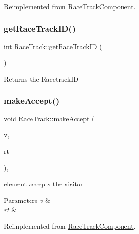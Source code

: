 Reimplemented from \mbox{\hyperlink{class_race_track_component_a6b57a071d1f11ddccd416fdbfe7e973b}{Race\+Track\+Component}}.

\mbox{\label{class_race_track_af85156b4218d023460f5287e6b866226}} 
\subsubsection{\texorpdfstring{get\+Race\+Track\+I\+D()}{getRaceTrackID()}}
{\footnotesize\ttfamily int Race\+Track\+::get\+Race\+Track\+ID (\begin{DoxyParamCaption}{ }\end{DoxyParamCaption})\hspace{0.3cm}{\ttfamily [inline]}}

\begin{DoxyReturn}{Returns}
the Racetrack\+ID 
\end{DoxyReturn}
\mbox{\label{class_race_track_abe1b09c550e3c99eb806ccf24aa74acb}} 
\subsubsection{\texorpdfstring{make\+Accept()}{makeAccept()}}
{\footnotesize\ttfamily void Race\+Track\+::make\+Accept (\begin{DoxyParamCaption}\item[{\mbox{\hyperlink{class_big_brother}{Big\+Brother}} $\ast$}]{v,  }\item[{int}]{rt }\end{DoxyParamCaption})\hspace{0.3cm}{\ttfamily [inline]}, {\ttfamily [virtual]}}

element accepts the visitor 
\begin{DoxyParams}{Parameters}
{\em v} & \\
\hline
{\em rt} & \\
\hline
\end{DoxyParams}


Reimplemented from \mbox{\hyperlink{class_race_track_component_a7cfe0c366248474e2665d42724c09bca}{Race\+Track\+Component}}.

